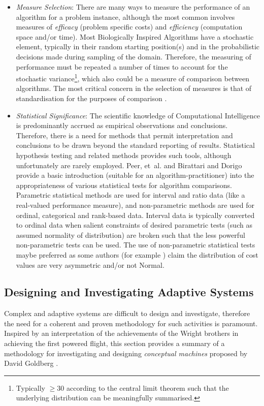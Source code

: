 \begin{itemize}
	\item \emph{Measure Selection}: There are many ways to measure the performance of an algorithm for a problem instance, although the most common involves measures of \emph{efficacy} (problem specific costs) and \emph{efficiency} (computation space and/or time). Most Biologically Inspired Algorithms have a stochastic element, typically in their random starting position(s) and in the probabilistic decisions made during sampling of the domain. Therefore, the measuring of performance must be repeated a number of times to account for the stochastic variance\footnote{Typically $\geq30$ according to the central limit theorem such that the underlying distribution can be meaningfully summarised.}, which also could be a measure of comparison between algorithms. The most critical concern in the selection of measures is that of standardisation for the purposes of comparison \cite{Birattari2005a, Barr1995}.	
	
	\item \emph{Statistical Significance}: The scientific knowledge of Computational Intelligence is predominantly accrued as empirical observations and conclusions. Therefore, there is a need for methods that permit interpretation and conclusions to be drawn beyond the standard reporting of results. Statistical hypothesis testing and related methods provides such tools, although unfortunately are rarely employed. Peer, et~al. \cite{Peer2003} and Birattari and Dorigo \cite{Birattari2005} provide a basic introduction (suitable for an algorithm-practitioner) into the appropriateness of various statistical tests for algorithm comparisons. Parametric statistical methods are used for interval and ratio data (like a real-valued performance measure), and non-parametric methods are used for ordinal, categorical and rank-based data. Interval data is typically converted to ordinal data when salient constraints of desired parametric tests (such as assumed normality of distribution) are broken such that the less powerful non-parametric tests can be used. The use of non-parametric statistical tests maybe preferred as some authors (for example \cite{Chiarandini2005}) claim the distribution of cost values are very asymmetric and/or not Normal.
\end{itemize}

%
%
% 
\subsection{Designing and Investigating Adaptive Systems}
\label{subsec:smallmodels}
Complex and adaptive systems are difficult to design and investigate, therefore the need for a coherent and proven methodology for such activities is paramount. Inspired by an interpretation of the achievements of the Wright brothers in achieving the first powered flight, this section provides a summary of a methodology for investigating and designing \emph{conceptual machines} proposed by David Goldberg \cite{Goldberg2002}. 

